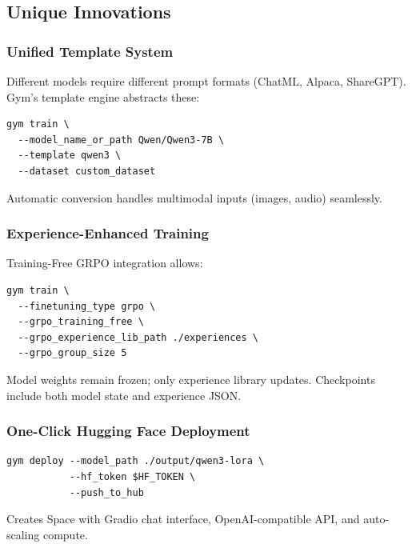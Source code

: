 \subsection{Unique Innovations}

\subsubsection{Unified Template System}
Different models require different prompt formats (ChatML, Alpaca, ShareGPT). Gym's template engine abstracts these:

\begin{verbatim}
gym train \
  --model_name_or_path Qwen/Qwen3-7B \
  --template qwen3 \
  --dataset custom_dataset
\end{verbatim}

Automatic conversion handles multimodal inputs (images, audio) seamlessly.

\subsubsection{Experience-Enhanced Training}
Training-Free GRPO integration allows:

\begin{verbatim}
gym train \
  --finetuning_type grpo \
  --grpo_training_free \
  --grpo_experience_lib_path ./experiences \
  --grpo_group_size 5
\end{verbatim}

Model weights remain frozen; only experience library updates. Checkpoints include both model state and experience JSON.

\subsubsection{One-Click Hugging Face Deployment}
\begin{verbatim}
gym deploy --model_path ./output/qwen3-lora \
           --hf_token $HF_TOKEN \
           --push_to_hub
\end{verbatim}

Creates Space with Gradio chat interface, OpenAI-compatible API, and auto-scaling compute.

